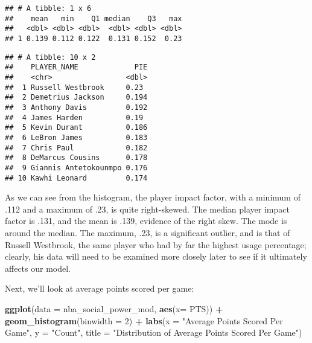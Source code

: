 \documentclass[]{article}
\newenvironment{Shaded}{\begin{snugshade}}{\end{snugshade}}
\newcommand{\DataTypeTok}[1]{\textcolor[rgb]{0.13,0.29,0.53}{#1}}
\newcommand{\DecValTok}[1]{\textcolor[rgb]{0.00,0.00,0.81}{#1}}
\newcommand{\KeywordTok}[1]{\textcolor[rgb]{0.13,0.29,0.53}{\textbf{#1}}}
\newcommand{\NormalTok}[1]{#1}
\newcommand{\OperatorTok}[1]{\textcolor[rgb]{0.81,0.36,0.00}{\textbf{#1}}}
\newcommand{\StringTok}[1]{\textcolor[rgb]{0.31,0.60,0.02}{#1}}
\begin{document}
\begin{verbatim}
## # A tibble: 1 x 6
##    mean   min    Q1 median    Q3   max
##   <dbl> <dbl> <dbl>  <dbl> <dbl> <dbl>
## 1 0.139 0.112 0.122  0.131 0.152  0.23
\end{verbatim}

\begin{Shaded}
\end{Shaded}

\begin{verbatim}
## # A tibble: 10 x 2
##    PLAYER_NAME             PIE
##    <chr>                 <dbl>
##  1 Russell Westbrook     0.23 
##  2 Demetrius Jackson     0.194
##  3 Anthony Davis         0.192
##  4 James Harden          0.19 
##  5 Kevin Durant          0.186
##  6 LeBron James          0.183
##  7 Chris Paul            0.182
##  8 DeMarcus Cousins      0.178
##  9 Giannis Antetokounmpo 0.176
## 10 Kawhi Leonard         0.174
\end{verbatim}

As we can see from the histogram, the player impact factor, with a
minimum of .112 and a maximum of .23, is quite right-skewed. The median
player impact factor is .131, and the mean is .139, evidence of the
right skew. The mode is around the median. The maximum, .23, is a
significant outlier, and is that of Russell Westbrook, the same player
who had by far the highest usage percentage; clearly, his data will need
to be examined more closely later to see if it ultimately affects our
model.

Next, we'll look at average points scored per game:

\begin{Shaded}
\begin{Highlighting}[]
\KeywordTok{ggplot}\NormalTok{(}\DataTypeTok{data =}\NormalTok{ nba_social_power_mod, }\KeywordTok{aes}\NormalTok{(}\DataTypeTok{x=}\NormalTok{ PTS)) }\OperatorTok{+}\StringTok{ }
\StringTok{  }\KeywordTok{geom_histogram}\NormalTok{(}\DataTypeTok{binwidth =} \DecValTok{2}\NormalTok{) }\OperatorTok{+}
\StringTok{  }\KeywordTok{labs}\NormalTok{(}\DataTypeTok{x =} \StringTok{"Average Points Scored Per Game"}\NormalTok{,}
       \DataTypeTok{y =} \StringTok{"Count"}\NormalTok{,}
       \DataTypeTok{title =} \StringTok{"Distribution of Average Points Scored Per Game"}\NormalTok{)}
\end{Highlighting}
\end{Shaded}
\end{document}
